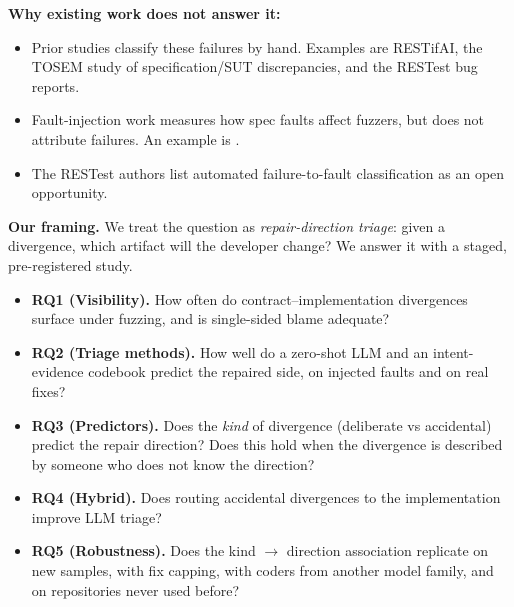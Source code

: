 \documentclass[acmsmall,screen,review,anonymous]{acmart}
\begin{document}
\textbf{Why existing work does not answer it:}
\begin{itemize}
\item Prior studies classify these failures by hand. Examples are RESTifAI, the TOSEM study of specification/SUT discrepancies, and the RESTest bug reports.
\item Fault-injection work measures how spec faults affect fuzzers, but does not attribute failures. An example is \cite{arXiv2607_12101}.
\item The RESTest authors list automated failure-to-fault classification as an open opportunity.
\end{itemize}

\textbf{Our framing.} We treat the question as \emph{repair-direction triage}: given a divergence, which artifact will the developer change? We answer it with a staged, pre-registered study.

\begin{itemize}
\item \textbf{RQ1 (Visibility).} How often do contract--implementation divergences surface under fuzzing, and is single-sided blame adequate?
\item \textbf{RQ2 (Triage methods).} How well do a zero-shot LLM and an intent-evidence codebook predict the repaired side, on injected faults and on real fixes?
\item \textbf{RQ3 (Predictors).} Does the \emph{kind} of divergence (deliberate vs accidental) predict the repair direction? Does this hold when the divergence is described by someone who does not know the direction?
\item \textbf{RQ4 (Hybrid).} Does routing accidental divergences to the implementation improve LLM triage?
\item \textbf{RQ5 (Robustness).} Does the kind $\rightarrow$ direction association replicate on new samples, with fix capping, with coders from another model family, and on repositories never used before?
\end{itemize}
\end{document}
